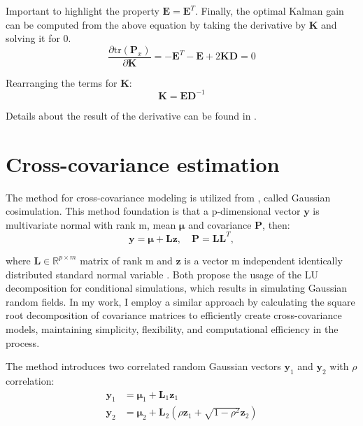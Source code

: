 Important to highlight the property $\mathbf{E}=\mathbf{E}^T$. Finally, the optimal Kalman gain can be computed from the above equation by taking the derivative by $\mathbf{K}$ and solving it for 0.
\begin{equation}
    \frac{\partial \mathrm{tr}(\mathbf{P}_{x})}{\partial\mathbf{K}} = -\mathbf{E}^T-\mathbf{E}+2\mathbf{KD}=0
\end{equation}

Rearranging the terms for $\mathbf{K}$:
\begin{equation}
    \mathbf{K}=\mathbf{E}\mathbf{D}^{-1}
\end{equation}

Details about the result of the derivative can be found in \cite{discrete_kalman_tutorial}.

\section{Cross-covariance estimation}

The method for cross-covariance modeling is utilized from \cite{oliver2003gaussian}, called Gaussian cosimulation. This method foundation is that a p-dimensional vector $\mathbf{y}$ is multivariate normal with rank m, mean $\boldsymbol{\mu}$ and covariance $\mathbf{P}$, then:
\begin{equation}
    \mathbf{y}=\boldsymbol{\mu} + \mathbf{L}\mathbf{z}, \quad \mathbf{P}=\mathbf{L}\mathbf{L}^T,
\end{equation}

where $\mathbf{L}\in\mathbb{R}^{p\times m}$ matrix of rank m and $\mathbf{z}$ is a vector m independent identically distributed standard normal variable \cite{rao}. Both \cite{Alabert1987, Davis1987} propose the usage of the LU decomposition for conditional simulations, which results in simulating Gaussian random fields. In my work, I employ a similar approach by calculating the square root decomposition of covariance matrices to efficiently create cross-covariance models, maintaining simplicity, flexibility, and computational efficiency in the process.

The method introduces two correlated random Gaussian vectors $\mathbf{y}_1$ and $\mathbf{y}_2$ with $\rho$ correlation:
\begin{equation}
\begin{aligned}
    \mathbf{y}_1 &= \boldsymbol{\mu}_1+\mathbf{L}_1\mathbf{z}_1 \\
    \mathbf{y}_2 &= \boldsymbol{\mu}_2+\mathbf{L}_2\left(\rho\mathbf{z}_1+\sqrt{1-\rho^2}\mathbf{z}_2\right)
\end{aligned}
\end{equation}

